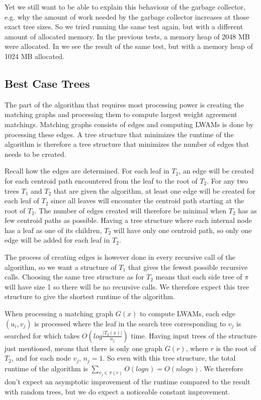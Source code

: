 Yet we still want to be able to explain this behaviour of the garbage collector, e.g. why the amount of work needed by the garbage collector increases at those exact tree sizes. So we tried running the same test again, but with a different amount of allocated memory. In the previous tests, a memory heap of 2048 MB were allocated. In  we see the result of the same test, but with a memory heap of 1024 MB allocated. 

\subsection{Best Case Trees}
The part of the algorithm that requires most processing power is creating the matching graphs and processing them to compute largest weight agreement matchings. Matching graphs consists of edges and computing LWAMs is done by processing these edges. A tree structure that minimizes the runtime of the algorithm is therefore a tree structure that minimizes the number of edges that needs to be created.

Recall how the edges are determined. For each leaf in $T_2$, an edge will be created for each centroid path encountered from the leaf to the root of $T_2$. For any two trees $T_1$ and $T_2$ that are given the algorithm, at least one edge will be created for each leaf of $T_2$ since all leaves will encounter the centroid path starting at the root of $T_2$. The number of edges created will therefore be minimal when $T_2$ has as few centroid paths as possible. Having a tree structure where each internal node has a leaf as one of its children, $T_2$ will have only one centroid path, so only one edge will be added for each leaf in $T_2$.

The process of creating edges is however done in every recursive call of the algorithm, so we want a structure of $T_1$ that gives the fewest possible recursive calls. Choosing the same tree structure as for $T_2$ means that each side tree of $\pi$ will have size 1 so there will be no recursive calls. We therefore expect this tree structure to give the shortest runtime of the algorithm.

When processing a matching graph $G(x)$ to compute LWAMs, each edge $(u_i, v_j)$ is processed where the leaf in the search tree corresponding to $v_j$ is searched for which takes $O(log\frac{|T_2(x)|}{n_j})$ time. Having input trees of the structure just mentioned, means that there is only one graph $G(r)$, where $r$ is the root of $T_2$, and for each node $v_j$, $n_j = 1$. So even with this tree structure, the total runtime of the algorithm is $\sum_{v_j \in \pi(r)} O(log n) = O(nlogn)$. We therefore don't expect an asymptotic improvement of the runtime compared to the result with random trees, but we do expect a noticeable constant improvement.

